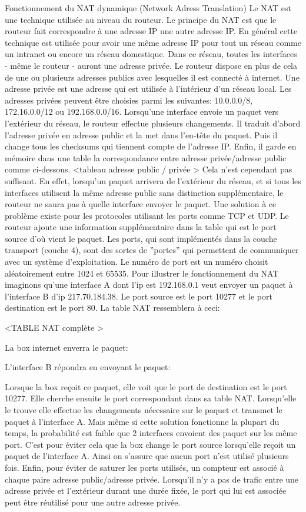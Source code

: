 Fonctionnement du NAT dynamique (Network Adress Translation)
Le NAT est une technique utilisée au niveau du routeur. Le principe du NAT est
que le routeur fait correspondre à une adresse IP une autre adresse IP. En
général cette technique est utilisée pour avoir une même adresse IP pour tout
un réseau comme un intranet ou encore un réseau domestique. Dans ce réseau,
toutes les interfaces - même le routeur - auront une adresse privée. Le routeur
dispose en plus de cela de une ou plusieurs adresses publics avec lesquelles il
est connecté à internet. Une adresse privée est une adresse qui est utilisée à
l'intérieur d'un réseau local. Les adresses privées peuvent être choisies parmi
les suivantes: 10.0.0.0/8, 172.16.0.0/12 ou 192.168.0.0/16.  Lorsqu'une
interface envoie un paquet vers l'extérieur du réseau, le routeur effectue
plusieurs changements. Il traduit d'abord l'adresse privée en adresse public et
la met dans l'en-tête du paquet. Puis il change tous les checksums qui tiennent
compte de l'adresse IP. Enfin, il garde en mémoire dans une table la
correspondance entre adresse privée/adresse public comme ci-dessous.  <tableau
adresse public / privée >
Cela n'est cependant pas suffisant. En effet, lorsqu'un paquet arrivera de l'extérieur du réseau,  et si tous les interfaces utilisent la même adresse public sans distinction supplémentaire, le routeur ne saura pas à quelle interface envoyer le paquet. 
Une solution à ce problème existe pour les protocoles utilisant les ports comme TCP et UDP. Le routeur ajoute une information supplémentaire dans la table qui est le port source d'où vient le paquet. Les ports, qui sont implémentés dans la couche transport (couche 4), sont des sortes de ''portes'' qui permettent de communiquer avec un système d'exploitation. Le numéro de port est un numéro choisit aléatoirement entre 1024 et 65535.
Pour illustrer le fonctionnement du NAT imaginons qu'une interface A dont l'ip est 192.168.0.1 veut envoyer un paquet à l'interface B d'ip 217.70.184.38. Le port source est le port 10277 et le port destination est le port 80. 
La table NAT ressemblera à ceci:

<TABLE NAT complète > 

La box internet enverra le paquet:

L'interface B répondra en envoyant le paquet:

Lorsque la box reçoit ce paquet, elle voit que le port de destination est le port 10277. Elle cherche ensuite le port correspondant dans sa table NAT. Lorsqu'elle le trouve elle effectue les changements nécessaire sur le paquet et transmet le paquet à l'interface A.
Mais même si cette solution fonctionne la plupart du temps, la probabilité est faible que 2 interfaces envoient des paquet sur les même port. C'est pour éviter cela que la box change le port source lorsqu'elle reçoit un paquet de l'interface A. Ainsi on s'assure que aucun port n'est utilisé plusieurs fois. Enfin, pour éviter de saturer les ports utilisés, un compteur est associé à chaque paire adresse public/adresse privée. Lorsqu'il n'y a pas de trafic entre une adresse privée et l'extérieur durant une durée fixée, le port qui lui est associée peut être réutilisé pour une autre adresse privée.

